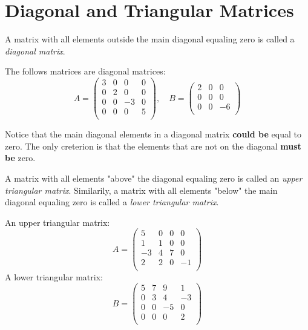 \section{Diagonal and Triangular Matrices}
A matrix with all elements outside the main diagonal equaling zero is called a \emph{diagonal matrix}.
\begin{example}
  
  The follows matrices are diagonal matrices:
  \begin{equation*}
	A=
	\begin{pmatrix}
	  3 & 0 & 0 & 0\\
	  0 & 2 & 0 & 0\\
	  0 & 0 & -3 & 0\\
	  0 & 0 & 0 & 5\\
	\end{pmatrix},\quad
	B=
	\begin{pmatrix}
	  2 & 0 & 0\\
	  0 & 0 & 0\\
	  0 & 0 & -6\\
	\end{pmatrix}
  \end{equation*}
\end{example}
\begin{warning}
  Notice that the main diagonal elements in a diagonal matrix \textbf{could be} equal to zero. The only creterion is that the elements that are not on the diagonal \textbf{must be} zero.
\end{warning}

A matrix with all elements "above" the diagonal equaling zero is called an \emph{upper triangular matrix}. Similarily, a matrix with all elements "below" the main diagonal equaling zero is called a \emph{lower triangular matrix}.
\begin{example}
  
  An upper triangular matrix:
  \begin{equation*}
	A=
	\begin{pmatrix}
	  5 & 0 & 0 & 0\\
	  1 & 1 & 0 & 0\\
	  -3 & 4 & 7 & 0\\
	  2 & 2 & 0 & -1\\
	\end{pmatrix}
  \end{equation*}
  A lower triangular matrix:
  \begin{equation*}
	B=
	\begin{pmatrix}
	  5 & 7 & 9 & 1\\
	  0 & 3 & 4 & -3\\
	  0 & 0 & -5 & 0\\
	  0 & 0 & 0 & 2\\
	\end{pmatrix}
  \end{equation*}
\end{example}

